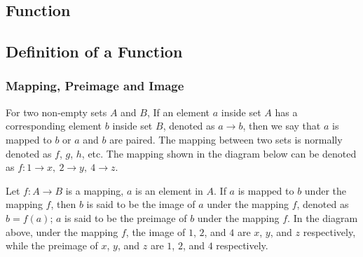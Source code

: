 \documentclass{report}
\begin{document}
\begin{multicols}{2}

  \chapter{Function}

  \section{Definition of a Function}

  \subsection*{Mapping, Preimage and Image}

  For two non-empty sets $A$ and $B$, If an element $a$ inside set $A$ has a
  corresponding element $b$ inside set $B$, denoted as $a \to b$, then we say
  that $a$ is mapped to $b$ or $a$ and $b$ are paired. The mapping between two
  sets is normally denoted as $f$, $g$, $h$, etc. The mapping shown in the
  diagram below can be denoted as $f:1 \to x,\ 2 \to y,\ 4 \to z$.

  \begin{center}
  \end{center}

  Let $f:A \to B$ is a mapping, $a$ is an element in $A$. If $a$ is mapped to $b$
  under the mapping $f$, then $b$ is said to be the image of $a$ under the
  mapping $f$, denoted as $b = f(a)$; $a$ is said to be the preimage of $b$ under
  the mapping $f$. In the diagram above, under the mapping $f$, the image of $1$,
  $2$, and $4$ are $x$, $y$, and $z$ respectively, while the preimage of $x$,
  $y$, and $z$ are $1$, $2$, and $4$ respectively.


\end{multicols}
\end{document}
